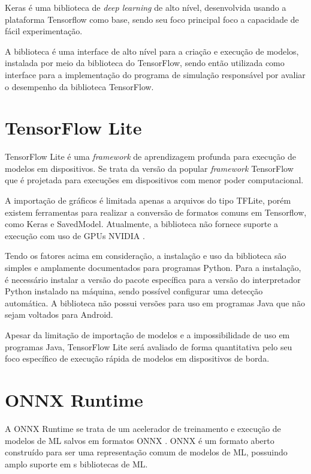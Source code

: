 Keras \cite{chollet2015keras} é uma biblioteca de \textit{deep learning} de alto nível, desenvolvida usando a plataforma Tensorflow como base, sendo seu foco principal foco a capacidade de fácil experimentação.

A biblioteca é uma interface de alto nível para a criação e execução de modelos, instalada por meio da biblioteca do TensorFlow, sendo então utilizada como interface para a implementação do programa de simulação responsável por avaliar o desempenho da biblioteca TensorFlow.

\section{TensorFlow Lite}
\label{tensorflow-lite}

TensorFlow Lite \cite{ml_site_tensorflow_lite} é uma \textit{framework} de aprendizagem profunda para execução de modelos em dispositivos. Se trata da versão da popular \textit{framework} TensorFlow que é projetada para execuções em dispositivos com menor poder computacional.

A importação de gráficos é limitada apenas a arquivos do tipo TFLite, porém existem ferramentas para realizar a conversão de formatos comuns em Tensorflow, como Keras e SavedModel. Atualmente, a biblioteca não fornece suporte a execução com uso de GPUs NVIDIA \cite{ml_site_tensorflow_lite_gpus}.

Tendo os fatores acima em consideração, a instalação e uso da biblioteca são simples e amplamente documentados para programas Python. Para a instalação, é necessário instalar a versão do pacote específica para a versão do interpretador Python instalado na máquina, sendo possível configurar uma detecção automática. A biblioteca não possui versões para uso em programas Java que não sejam voltados para Android.

Apesar da limitação de importação de modelos e a impossibilidade de uso em programas Java, TensorFlow Lite será avaliado de forma quantitativa pelo seu foco específico de execução rápida de modelos em dispositivos de borda.

\section{ONNX Runtime}

A ONNX Runtime \cite{ml_site_onnx_runtime} se trata de um acelerador de treinamento e execução de modelos de ML salvos em formatos ONNX \cite{ml_site_onnx}. \acrfull{ONNX} é um formato aberto construído para ser uma representação comum de modelos de ML, possuindo amplo suporte em s bibliotecas de ML.

